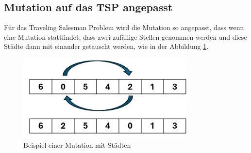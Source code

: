 \subsection{Mutation auf das TSP angepasst
\label{buch:paper:varalg:subsection:mutation_tsp}}
Für das Traveling Salesman Problem wird die Mutation so angepasst,
dass wenn eine Mutation stattfindet, dass zwei zufällige Stellen 
genommen werden und diese Städte dann mit einander getauscht werden, 
wie in der Abbildung \ref{fig:mutation_genetic_string_cities}.
\begin{figure}
	\centering
	\includegraphics[width=0.8\textwidth]{
        papers/varalg/images/teil3/09GeneticStringCitiesMutation.png
        }
	\caption{Beispiel einer Mutation mit Städten}
	\label{fig:mutation_genetic_string_cities}
\end{figure}
